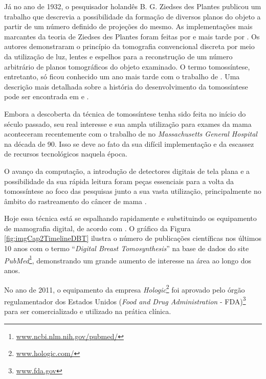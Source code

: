 Já no ano de 1932, o pesquisador holandês B. G. Ziedses des Plantes publicou um trabalho \cite{des1932neue} que descrevia a possibilidade da formação de diversos planos do objeto a partir de um número definido de projeções do mesmo. As implementações mais marcantes da teoria de Ziedses des Plantes foram feitas por  e mais tarde por . Os autores demonstraram o princípio da tomografia convencional discreta por meio da utilização de luz, lentes e espelhos para a reconstrução de um número arbitrário de planos tomográficos do objeto examinado. O termo tomossíntese, entretanto, só ficou conhecido um ano mais tarde com o trabalho de . Uma descrição mais detalhada sobre a história do desenvolvimento da tomossíntese pode ser encontrada em   e . 

Embora a descoberta da técnica de tomossíntese tenha sido feita no início do século passado, seu real interesse e sua ampla utilização para exames da mama aconteceram recentemente com o trabalho de   no \textit{Massachusetts General Hospital} na década de 90. Isso se deve ao fato da sua difícil implementação e da escassez de recursos tecnológicos naquela época. 

O avanço da computação, a introdução de detectores digitais de tela plana e a possibilidade da sua rápida leitura foram peças essenciais para a volta da tomossíntese ao foco das pesquisas junto a sua vasta utilização, principalmente no âmbito do rastreamento do câncer de mama \cite{Niklason20185}. 

Hoje essa técnica está se espalhando rapidamente e substituindo os equipamento de mamografia digital, de acordo com . O gráfico da Figura \ref{fig:imgCap2TimelineDBT} ilustra o número de publicações científicas nos últimos 10 anos com o termo ``\textit{Digital Breast Tomosynthesis}'' na base de dados do site \textit{PubMed}\footnote{\url{www.ncbi.nlm.nih.gov/pubmed/}}, demonstrando um grande aumento de interesse na área ao longo dos anos.

No ano de 2011, o equipamento da empresa \textit{Hologic}\footnote{\url{www.hologic.com/}} foi aprovado pelo órgão regulamentador dos Estados Unidos (\textit{Food and Drug Administration} - \acs{FDA})\footnote{\url{www.fda.gov}} para ser comercializado e utilizado na prática clínica.  
    
